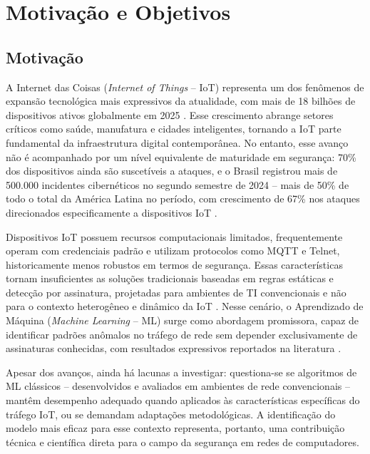 \chapter{Motivação e Objetivos}\label{chap:problema}

\section{Motivação}\label{sec:motivacao}

A Internet das Coisas (\textit{Internet of Things} -- IoT) representa um dos fenômenos de expansão tecnológica mais expressivos da atualidade, com mais de 18 bilhões de dispositivos ativos globalmente em 2025 \citep{IoTBreakthrough2025}. Esse crescimento abrange setores críticos como saúde, manufatura e cidades inteligentes, tornando a IoT parte fundamental da infraestrutura digital contemporânea. No entanto, esse avanço não é acompanhado por um nível equivalente de maturidade em segurança: 70\% dos dispositivos ainda são suscetíveis a ataques, e o Brasil registrou mais de 500.000 incidentes cibernéticos no segundo semestre de 2024 -- mais de 50\% de todo o total da América Latina no período, com crescimento de 67\% nos ataques direcionados especificamente a dispositivos IoT \citep{NETSCOUT2025}.

Dispositivos IoT possuem recursos computacionais limitados, frequentemente operam com credenciais padrão e utilizam protocolos como MQTT e Telnet, historicamente menos robustos em termos de segurança. Essas características tornam insuficientes as soluções tradicionais baseadas em regras estáticas e detecção por assinatura, projetadas para ambientes de TI convencionais e não para o contexto heterogêneo e dinâmico da IoT \citep{Alfahaid2025}. Nesse cenário, o Aprendizado de Máquina (\textit{Machine Learning} -- ML) surge como abordagem promissora, capaz de identificar padrões anômalos no tráfego de rede sem depender exclusivamente de assinaturas conhecidas, com resultados expressivos reportados na literatura \citep{SouzaArima2024, Bochie2020}.

Apesar dos avanços, ainda há lacunas a investigar: questiona-se se algoritmos de ML clássicos -- desenvolvidos e avaliados em ambientes de rede convencionais -- mantêm desempenho adequado quando aplicados às características específicas do tráfego IoT, ou se demandam adaptações metodológicas. A identificação do modelo mais eficaz para esse contexto representa, portanto, uma contribuição técnica e científica direta para o campo da segurança em redes de computadores.

